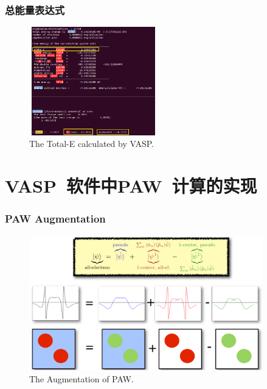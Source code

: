 \documentclass[cjk,slidestop,compress,mathserif,blue]{beamer}
\begin{document}
\frame
{
	\frametitle{总能量表达式}
\fontsize{6.5pt}{4.2pt}
\begin{figure}[h!]
\centering
\vspace*{-0.18in}
\includegraphics[height=1.85in,width=2.2in,viewport=0 0 600 495,clip]{Figures/VASP_Total_ENE.png}
\caption{\tiny \textrm{The Total-E calculated by VASP.}}%
\label{TOTEN_VASP}
\end{figure}
}

\section{\rm{VASP~}软件中\rm{PAW~}计算的实现}
\frame
{
	\frametitle{\textrm{PAW Augmentation}}
\begin{figure}[h!]
\centering
\includegraphics[height=2.3in,width=4.0in,viewport=0 0 1280 745,clip]{Figures/PAW-baseset.png}
\caption{\tiny \textrm{The Augmentation of PAW.}}%
\label{PAW_baseset}
\end{figure}
}
\end{document}
